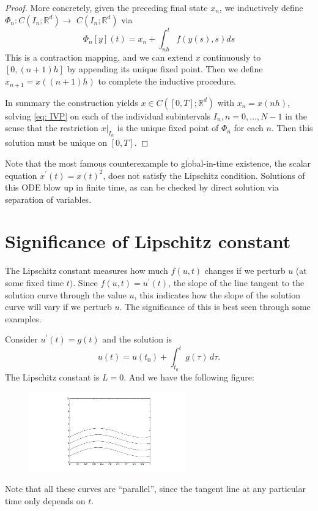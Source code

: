 \begin{proof}
More concretely, given the preceding final state $x_n$, we inductively define $\Phi_n: C\left(I_n ; \mathbb{R}^d\right) \rightarrow$ $C\left(I_n ; \mathbb{R}^d\right)$ via
$$
\Phi_n[y](t)=x_n+\int_{n h}^t f(y(s), s) d s
$$
This is a contraction mapping, and we can extend $x$ continuously to $[0,(n+1) h]$ by appending its unique fixed point. Then we define $x_{n+1}=x((n+1) h)$ to complete the inductive procedure.

In summary the construction yields $x \in C\left([0, T] ; \mathbb{R}^d\right)$ with $x_n=x(n h)$, solving \eqref{eq: IVP} on each of the individual subintervals $I_n, n=0, \ldots, N-1$ in the sense that the restriction $\left.x\right|_{I_n}$ is the unique fixed point of $\Phi_n$ for each $n$. Then this solution must be unique on $ [0,T] $. 
\end{proof}

\begin{note}
Note that the most famous counterexample to global-in-time existence, the scalar equation $x^{\prime}(t)=x(t)^2$, does not satisfy the Lipschitz condition. Solutions of this ODE blow up in finite time, as can be checked by direct solution via separation of variables.
\end{note}

\section{Significance of Lipschitz constant} 
The Lipschitz constant measures how much $f(u, t)$ changes if we perturb $u$ (at some fixed time $t)$. Since $f(u, t)=u^{\prime}(t)$, the slope of the line tangent to the solution curve through the value $u$, this indicates how the slope of the solution curve will vary if we perturb $u$. The significance of this is best seen through some examples. 


\begin{example}
\label{eg: Lip Integral}
Consider $ u^\prime (t) = g(t) $ and the solution is 
\[
    u(t) = u(t_0) + \int_{t_0}^{t} g(\tau) \, d\tau.  
\]
The Lipschitz constant is $ L=0 $. And we have the following figure:
\begin{figure}[H]
    \centering
    \includegraphics[width=0.6\textwidth]{figures/2-1.png}
\end{figure}
Note that all these curves are ``parallel'', since the tangent line at any particular time only depends on $ t $. 
\end{example}



